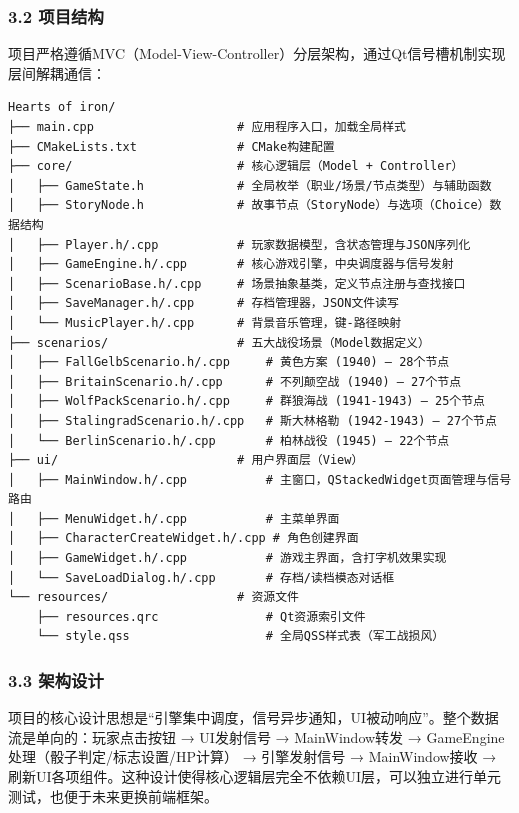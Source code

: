 \hypertarget{ux9879ux76eeux7ed3ux6784}{%
\subsubsection{3.2 项目结构}\label{ux9879ux76eeux7ed3ux6784}}

项目严格遵循MVC（Model-View-Controller）分层架构，通过Qt信号槽机制实现层间解耦通信：

\begin{verbatim}
Hearts of iron/
├── main.cpp                    # 应用程序入口，加载全局样式
├── CMakeLists.txt              # CMake构建配置
├── core/                       # 核心逻辑层（Model + Controller）
│   ├── GameState.h             # 全局枚举（职业/场景/节点类型）与辅助函数
│   ├── StoryNode.h             # 故事节点（StoryNode）与选项（Choice）数据结构
│   ├── Player.h/.cpp           # 玩家数据模型，含状态管理与JSON序列化
│   ├── GameEngine.h/.cpp       # 核心游戏引擎，中央调度器与信号发射
│   ├── ScenarioBase.h/.cpp     # 场景抽象基类，定义节点注册与查找接口
│   ├── SaveManager.h/.cpp      # 存档管理器，JSON文件读写
│   └── MusicPlayer.h/.cpp      # 背景音乐管理，键-路径映射
├── scenarios/                  # 五大战役场景（Model数据定义）
│   ├── FallGelbScenario.h/.cpp     # 黄色方案 (1940) — 28个节点
│   ├── BritainScenario.h/.cpp      # 不列颠空战 (1940) — 27个节点
│   ├── WolfPackScenario.h/.cpp     # 群狼海战 (1941-1943) — 25个节点
│   ├── StalingradScenario.h/.cpp   # 斯大林格勒 (1942-1943) — 27个节点
│   └── BerlinScenario.h/.cpp       # 柏林战役 (1945) — 22个节点
├── ui/                         # 用户界面层（View）
│   ├── MainWindow.h/.cpp           # 主窗口，QStackedWidget页面管理与信号路由
│   ├── MenuWidget.h/.cpp           # 主菜单界面
│   ├── CharacterCreateWidget.h/.cpp # 角色创建界面
│   ├── GameWidget.h/.cpp           # 游戏主界面，含打字机效果实现
│   └── SaveLoadDialog.h/.cpp       # 存档/读档模态对话框
└── resources/                  # 资源文件
    ├── resources.qrc               # Qt资源索引文件
    └── style.qss                   # 全局QSS样式表（军工战损风）
\end{verbatim}

\hypertarget{ux67b6ux6784ux8bbeux8ba1}{%
\subsubsection{3.3 架构设计}\label{ux67b6ux6784ux8bbeux8ba1}}

项目的核心设计思想是``引擎集中调度，信号异步通知，UI被动响应''。整个数据流是单向的：玩家点击按钮
→ UI发射信号 → MainWindow转发 →
GameEngine处理（骰子判定/标志设置/HP计算） → 引擎发射信号 →
MainWindow接收 →
刷新UI各项组件。这种设计使得核心逻辑层完全不依赖UI层，可以独立进行单元测试，也便于未来更换前端框架。

